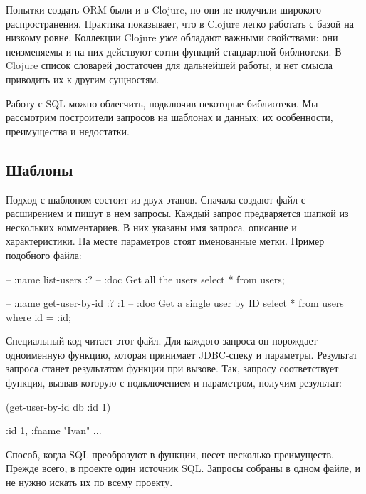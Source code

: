 Попытки создать ORM были и в Clojure, но они не получили широкого распространения. Практика показывает, что в Clojure легко работать с базой на низкому ровне. Коллекции Clojure \emph{уже} обладают важными свойствами: они неизменяемы и на них действуют сотни функций стандартной библиотеки. В Clojure список словарей достаточен для дальнейшей работы, и нет смысла приводить их к другим сущностям.

Работу с SQL можно облегчить, подключив некоторые библиотеки. Мы рассмотрим построители запросов на шаблонах и данных: их особенности, преимущества и недостатки.

\subsection{Шаблоны}

Подход с шаблоном состоит из двух этапов. Сначала создают файл с расширением  и пишут в нем запросы. Каждый запрос предваряется шапкой из нескольких комментариев. В них указаны имя запроса, описание и характеристики. На месте параметров стоят именованные метки. Пример подобного файла:

\begin{english}
  \begin{sql}
-- :name list-users :?
-- :doc Get all the users
select * from users;

-- :name get-user-by-id :? :1
-- :doc Get a single user by ID
select * from users
where id = :id;
  \end{sql}
\end{english}

Специальный код читает этот файл. Для каждого запроса он порождает одноименную функцию, которая принимает JDBC-спеку и параметры. Результат запроса станет результатом функции при вызове. Так, запросу  соответствует функция, вызвав которую с подключением и параметром, получим результат:

\begin{english}
  \begin{clojure}
(get-user-by-id db {:id 1})

{:id 1, :fname "Ivan" ...}
  \end{clojure}
\end{english}

Способ, когда SQL преобразуют в функции, несет несколько преимуществ. Прежде всего, в проекте один источник SQL. Запросы собраны в одном файле, и не нужно искать их по всему проекту.

